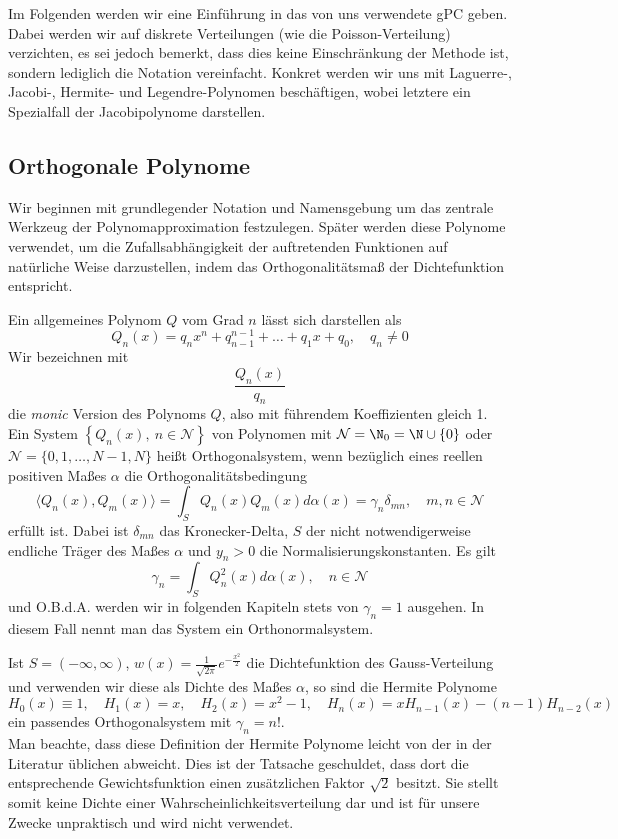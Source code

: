 Im Folgenden werden wir eine Einführung in das von uns verwendete gPC geben. Dabei werden wir auf diskrete Verteilungen (wie die Poisson-Verteilung) verzichten, es sei jedoch bemerkt, dass dies keine Einschränkung der Methode ist, sondern lediglich die Notation vereinfacht. Konkret werden wir uns mit Laguerre-, Jacobi-, Hermite- und Legendre-Polynomen beschäftigen, wobei letztere ein Spezialfall der Jacobipolynome darstellen. 
\subsection{Orthogonale Polynome}
Wir beginnen mit grundlegender Notation und Namensgebung um das zentrale Werkzeug der Polynomapproximation festzulegen. Später werden diese Polynome verwendet, um die Zufallsabhängigkeit der auftretenden Funktionen auf natürliche Weise darzustellen, indem das Orthogonalitätsmaß der Dichtefunktion entspricht.
\begin{mathdef}
Ein allgemeines Polynom $Q$ vom Grad $n$ lässt sich darstellen als
\[Q_n(x)=q_nx^n+q_{n-1}^{n-1}+\dots+q_1x+q_0,\quad q_n\ne 0\]
Wir bezeichnen mit 
\[\frac{Q_n(x)}{q_n}\]
die \emph{monic} Version des Polynoms $Q$, also mit führendem Koeffizienten gleich 1.\\
 Ein System $\left\lbrace Q_n(x),\: n\in\mathcal{N}\right\rbrace$ von Polynomen mit $\mathcal{N}=\N_0=\N\cup\lbrace 0\rbrace$ oder $\mathcal{N}=\lbrace 0,1,\dots,N-1,N\rbrace$ heißt Orthogonalsystem, wenn bezüglich eines reellen positiven Maßes $\alpha$ die Orthogonalitätsbedingung
 \[\langle Q_n(x),Q_m(x)\rangle =\int_S Q_n(x)Q_m(x)d\alpha(x)=\gamma_n\delta_{mn},\quad m,n\in\mathcal{N}\]
 erfüllt ist. Dabei ist $\delta_{mn}$ das Kronecker-Delta, $S$ der nicht notwendigerweise endliche Träger des Maßes $\alpha$ und $y_n>0$ die Normalisierungskonstanten. Es gilt 
 \[\gamma_n=\int_S Q_n^2(x)d\alpha(x),\quad n\in\mathcal{N}\] und O.B.d.A. werden wir in folgenden Kapiteln stets von $\gamma_n=1$ ausgehen. In diesem Fall nennt man das System ein Orthonormalsystem.
\end{mathdef}
\begin{mathbsp}
Ist $S=(-\infty,\infty)$, $w(x)=\frac{1}{\sqrt{2\pi}}e^{-\frac{x^2}{2}}$ die Dichtefunktion des Gauss-Verteilung und verwenden wir diese als Dichte des Maßes $\alpha$, so sind die Hermite Polynome
\[H_0(x)\equiv 1,\quad H_1(x)=x,\quad H_2(x)=x^2-1,\quad H_n(x)=xH_{n-1}(x)-(n-1)H_{n-2}(x)\]
ein passendes Orthogonalsystem mit $\gamma_n=n!$.\\
Man beachte, dass diese Definition der Hermite Polynome leicht von der in der Literatur üblichen abweicht. Dies ist der Tatsache geschuldet, dass dort die entsprechende Gewichtsfunktion einen zusätzlichen Faktor $\sqrt{2}$ besitzt. Sie stellt somit keine Dichte einer Wahrscheinlichkeitsverteilung dar und ist für unsere Zwecke unpraktisch und wird nicht verwendet. 
\end{mathbsp}

